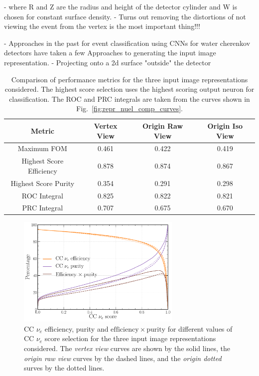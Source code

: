 - where R and Z are the radius and height of the detector cylinder and W is chosen for constant
surface density.
- Turns out removing the distortions of not viewing the event from the vertex is the most
important thing!!!

- Approaches in the past for event classification using CNNs for water cherenkov detectors have
taken a few Approaches to generating the input image representation.
- Projecting onto a 2d surface "outside" the detector

\begin{table}
    \begin{tabular}{cccc}
        Metric                   & Vertex View & Origin Raw View & Origin Iso View \\
        \midrule
        Maximum FOM              & 0.461       & 0.422           & 0.419           \\
        Highest Score Efficiency & 0.878       & 0.874           & 0.867           \\
        Highest Score Purity     & 0.354       & 0.291           & 0.298           \\
        ROC Integral             & 0.825       & 0.822           & 0.821           \\
        PRC Integral             & 0.707       & 0.675           & 0.670           \\
    \end{tabular}
    \caption[Comparison of performance metrics for three input image representations.]
    {Comparison of performance metrics for the three input image representations considered. The
        highest score selection uses the highest scoring output neuron for classification. The ROC
        and PRC integrals are taken from the curves shown in
        Fig.~\ref{fig:repr_nuel_comp_curves}.}
    \label{tab:repr}
\end{table}

\begin{figure} %
    \includegraphics[width=0.7\textwidth]{diagrams/7-results/repr_nuel_eff_curves.pdf}
    \caption[CC $\nu_{e}$ efficiency and purity curves for the three input image representations]
    {CC $\nu_{e}$ efficiency, purity and $\mathrm{efficiency}\times\mathrm{purity}$ for different
        values of CC $\nu_{e}$ score selection for the three input image representations
        considered. The \emph{vertex view} curves are shown by the solid lines, the \emph{origin
            raw view} curves by the dashed lines, and the \emph{origin dotted} surves by the dotted
        lines.}
    \label{fig:repr_nuel_eff_curves}
\end{figure}

